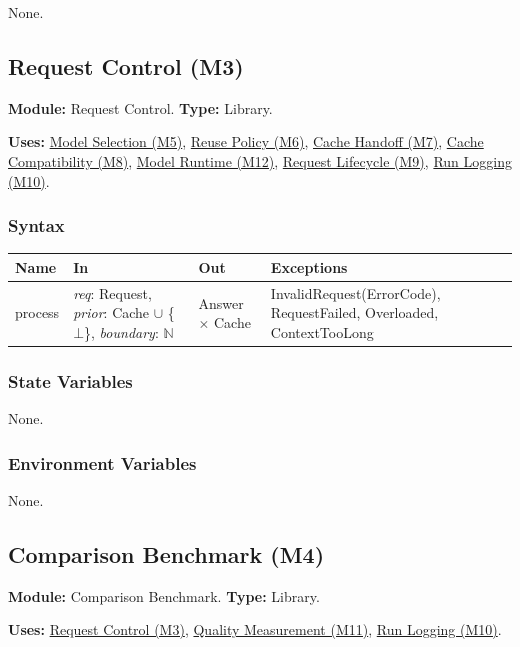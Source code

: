 \documentclass[12pt, titlepage]{article}
\begin{document}
None.

\newpage
\subsection{Request Control (M3)}\label{mCtrl}

\textbf{Module:} Request Control. \textbf{Type:} Library.

\textbf{Uses:} \hyperref[mSelect]{Model Selection (M5)}, \hyperref[mReuse]{Reuse Policy (M6)}, \hyperref[mHandoff]{Cache Handoff (M7)}, \hyperref[mCompat]{Cache Compatibility (M8)}, \hyperref[mModelRun]{Model Runtime (M12)}, \hyperref[mLife]{Request Lifecycle (M9)}, \hyperref[mLog]{Run Logging (M10)}.

\subsubsection*{Syntax}

\begin{tabularx}{\textwidth}{l X l X}
\toprule
\textbf{Name} & \textbf{In} & \textbf{Out} & \textbf{Exceptions}\\
\midrule
process & \emph{req}: Request, \emph{prior}: Cache $\cup$ \{$\bot$\}, \emph{boundary}: $\mathbb{N}$ & Answer $\times$ Cache & InvalidRequest(ErrorCode), RequestFailed, Overloaded, ContextTooLong\\
\bottomrule
\end{tabularx}

\subsubsection*{State Variables}

None.

\subsubsection*{Environment Variables}

None.

\newpage
\subsection{Comparison Benchmark (M4)}\label{mBench}

\textbf{Module:} Comparison Benchmark. \textbf{Type:} Library.

\textbf{Uses:} \hyperref[mCtrl]{Request Control (M3)}, \hyperref[mQuality]{Quality Measurement (M11)}, \hyperref[mLog]{Run Logging (M10)}.
\end{document}
